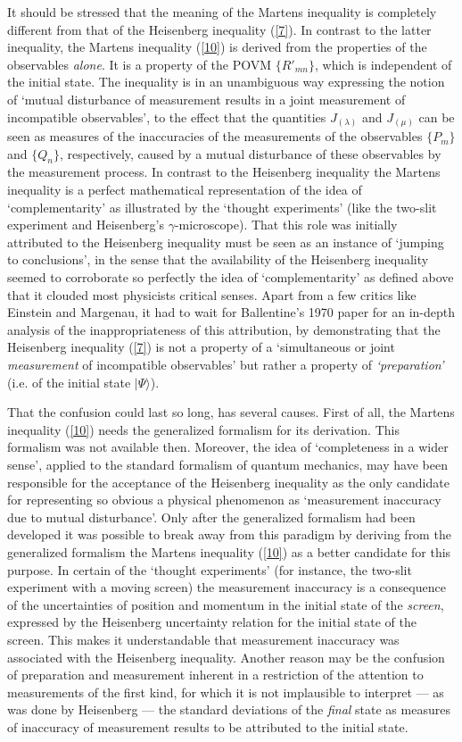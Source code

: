 \documentclass[12pt]{article}
\begin{document}
It should be stressed that the meaning of the Martens inequality
is completely different from that of the Heisenberg inequality
(\ref{7}). In contrast to the latter inequality, the Martens
inequality (\ref{10}) is derived from the properties of the
observables {\em alone}. It is a property of the POVM
$\{R'_{mn}\}$, which is independent of the initial state. The
inequality is in an unambiguous way expressing the notion of
`mutual disturbance of measurement results in a joint measurement
of incompatible observables', to the effect that the quantities
$J_{(\lambda)}$ and $J_{(\mu)}$ can be seen as measures of the
inaccuracies of the measurements of the observables $\{P_m\}$ and
$\{ Q_n\}$, respectively, caused by a mutual disturbance of these
observables by the measurement process. In contrast to the
Heisenberg inequality the Martens inequality is a perfect
mathematical representation of the idea of `complementarity' as
illustrated by the `thought experiments' (like the two-slit
experiment and Heisenberg's $\gamma$-microscope). That this role
was initially attributed to the Heisenberg inequality must be seen
as an instance of `jumping to conclusions', in the sense that the
availability of the Heisenberg inequality seemed to corroborate so
perfectly the idea of `complementarity' as defined above that it
clouded most physicists critical senses. Apart from a few critics
like Einstein and Margenau, it had to wait for Ballentine's 1970
paper for an in-depth analysis of the inappropriateness of this
attribution, by demonstrating that the Heisenberg inequality
(\ref{7}) is not a property of a `simultaneous or joint {\em
measurement} of incompatible observables' but rather a property of
{\em `preparation'} (i.e. of the initial state $|\Psi\rangle$).

That the confusion could last so long, has several causes. First
of all, the Martens inequality (\ref{10}) needs the generalized
formalism for its derivation. This formalism was not available
then. Moreover, the idea of `completeness in a wider sense',
applied to the standard formalism of quantum mechanics, may have
been responsible for the acceptance of the Heisenberg inequality
as the only candidate for representing so obvious a physical
phenomenon as `measurement inaccuracy due to mutual disturbance'.
Only after the generalized formalism had been developed it was
possible to break away from this paradigm by deriving from the
generalized formalism the Martens inequality (\ref{10}) as a
better candidate for this purpose. In certain of the `thought
experiments' (for instance, the two-slit experiment with a moving
screen) the measurement inaccuracy is a consequence of the
uncertainties of position and momentum in the initial state of the
{\em screen}, expressed by the Heisenberg uncertainty relation for
the initial state of the screen. This makes it understandable that
measurement inaccuracy was associated with the Heisenberg
inequality. Another reason may be the confusion of preparation and
measurement inherent in a restriction of the attention to
measurements of the first kind, for which it is not implausible to
interpret --- as was done by Heisenberg --- the standard deviations of
the {\em final} state as measures of inaccuracy of measurement
results to be attributed to the initial state.
\end{document}

